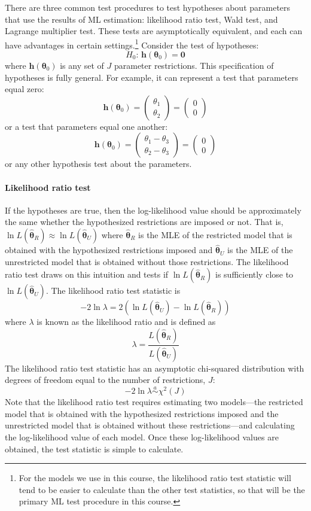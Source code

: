 \documentclass[11pt,letterpaper]{article}
\begin{document}
There are three common test procedures to test hypotheses about parameters that use the results of ML estimation: likelihood ratio test, Wald test, and Lagrange multiplier test. These tests are asymptotically equivalent, and each can have advantages in certain settings.\footnote{For the models we use in this course, the likelihood ratio test statistic will tend to be easier to calculate than the other test statistics, so that will be the primary ML test procedure in this course.} Consider the test of hypotheses:
$$H_0 \text{: } \bm{h}(\bm{\theta}_0) = \bm{0}$$
where $\bm{h}(\bm{\theta}_0)$ is any set of $J$ parameter restrictions. This specification of hypotheses is fully general. For example, it can represent a test that parameters equal zero:
$$\bm{h}(\bm{\theta}_0) = \begin{pmatrix}
  \theta_1 \\
  \theta_2
\end{pmatrix} = \begin{pmatrix}
  0 \\
  0
\end{pmatrix}$$
or a test that parameters equal one another:
$$\bm{h}(\bm{\theta}_0) = \begin{pmatrix}
  \theta_1 - \theta_3 \\
  \theta_2 - \theta_3
\end{pmatrix} = \begin{pmatrix}
  0 \\
  0
\end{pmatrix}$$
or any other hypothesis test about the parameters.

\paragraph{Likelihood ratio test} If the hypotheses are true, then the log-likelihood value should be approximately the same whether the hypothesized restrictions are imposed or not. That is, $\ln L(\widehat{\bm{\theta}}_R) \approx \ln L(\widehat{\bm{\theta}}_U)$ where $\widehat{\bm{\theta}}_R$ is the MLE of the restricted model that is obtained with the hypothesized restrictions imposed and $\widehat{\bm{\theta}}_U$ is the MLE of the unrestricted model that is obtained without those restrictions. The likelihood ratio test draws on this intuition and tests if $\ln L(\widehat{\bm{\theta}}_R)$ is sufficiently close to $\ln L(\widehat{\bm{\theta}}_U)$. The likelihood ratio test statistic is
$$-2 \ln \lambda = 2 \left( \ln L(\widehat{\bm{\theta}}_U) - \ln L(\widehat{\bm{\theta}}_R) \right)$$
where $\lambda$ is known as the likelihood ratio and is defined as
$$\lambda = \frac{L(\widehat{\bm{\theta}}_R)}{L(\widehat{\bm{\theta}}_U)}$$
The likelihood ratio test statistic has an asymptotic chi-squared distribution with degrees of freedom equal to the number of restrictions, $J$:
$$-2 \ln \lambda \overset{a}{\sim} \chi^2(J)$$
Note that the likelihood ratio test requires estimating two models---the restricted model that is obtained with the hypothesized restrictions imposed and the unrestricted model that is obtained without these restrictions---and calculating the log-likelihood value of each model. Once these log-likelihood values are obtained, the test statistic is simple to calculate.
\end{document}
